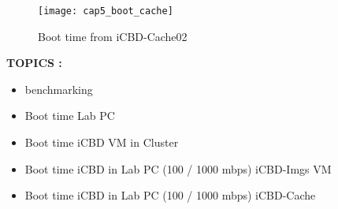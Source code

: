 \begin{figure}[htbp]
	\centering
	\texttt{[image: cap5\_boot\_cache]}
	\caption{Boot time from iCBD-Cache02}
	\label{fig:boot_cache}
\end{figure}


\textbf{TOPICS :}
\begin{itemize}
	\item benchmarking 
	\item Boot time Lab PC
	\item Boot time iCBD VM in Cluster
	\item Boot time iCBD in Lab PC (100 / 1000 mbps) iCBD-Imgs VM
	\item Boot time iCBD in Lab PC (100 / 1000 mbps) iCBD-Cache
\end{itemize}
